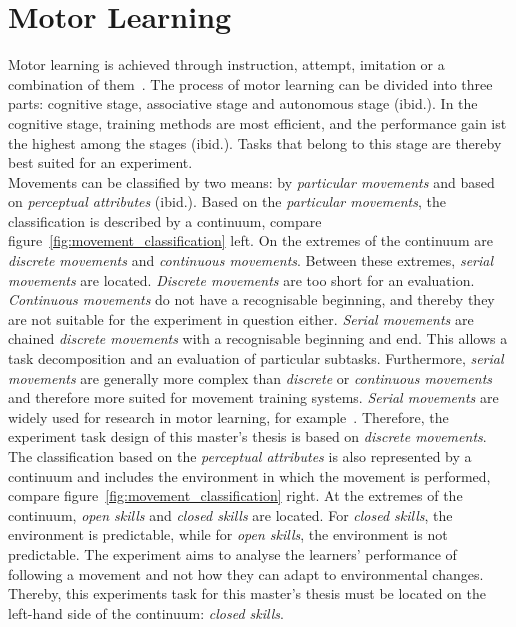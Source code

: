\section{Motor Learning}
\label{section:motor_learning}
Motor learning is achieved through instruction, attempt, imitation or a combination of them~\cite{mlbook}. The process of motor learning can be divided into three parts: cognitive stage, associative stage and autonomous stage (ibid.). In the cognitive stage, training methods are most efficient, and the performance gain ist the highest among the stages (ibid.). Tasks that belong to this stage are thereby best suited for an experiment.\\
Movements can be classified by two means: by \textit{particular movements} and based on \textit{perceptual attributes} (ibid.). Based on the \textit{particular movements}, the classification is described by a continuum, compare figure~\ref{fig:movement_classification} left. On the extremes of the continuum are \textit{discrete movements} and \textit{continuous movements}. Between these extremes, \textit{serial movements} are located. \textit{Discrete movements} are too short for an evaluation. \textit{Continuous movements} do not have a recognisable beginning, and thereby they are not suitable for the experiment in question either. \textit{Serial movements} are chained \textit{discrete movements} with a recognisable beginning and end. This allows a task decomposition and an evaluation of particular subtasks. Furthermore, \textit{serial movements} are generally more complex than \textit{discrete} or \textit{continuous movements} and therefore more suited for movement training systems. \textit{Serial movements} are widely used for research in motor learning, for example~\cite{lightguide,mythaichicoaches,elearningma}. Therefore, the experiment task design of this master's thesis is based on \textit{discrete movements}.\\
The classification based on the \textit{perceptual attributes} is also represented by a continuum and includes the environment in which the movement is performed, compare figure~\ref{fig:movement_classification} right. At the extremes of the continuum, \textit{open skills} and \textit{closed skills} are located. For \textit{closed skills}, the environment is predictable, while for\textit{ open skills}, the environment is not predictable. The experiment aims to analyse the learners' performance of following a movement and not how they can adapt to environmental changes. Thereby, this experiments task for this master's thesis must be located on the left-hand side of the continuum: \textit{closed skills}.
